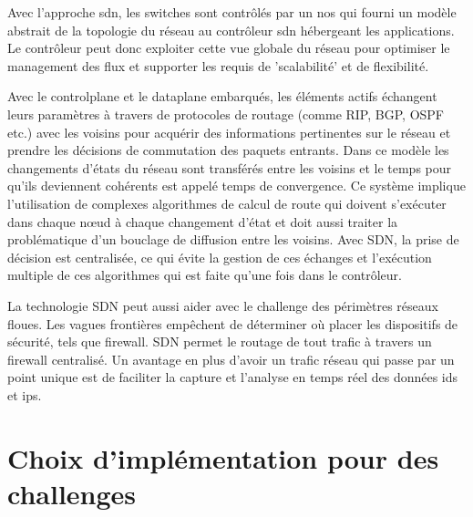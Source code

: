 Avec l'approche \gls{sdn}, les switches sont contrôlés par un \gls{nos} qui fourni un modèle abstrait de la topologie du réseau au contrôleur \gls{sdn} hébergeant les applications. Le contrôleur peut donc exploiter cette vue globale du réseau pour optimiser le management des flux et supporter les requis de 'scalabilité' et de flexibilité. \cite{WhySDN}

Avec le \gls{controlplane} et le \gls{dataplane} embarqués, les éléments actifs échangent leurs paramètres à travers de protocoles de routage (comme RIP, BGP, OSPF etc.) avec les voisins pour acquérir des informations pertinentes sur le réseau et prendre les décisions de commutation des paquets entrants. Dans ce modèle les changements d'états du réseau sont transférés entre les voisins et le temps pour qu'ils deviennent cohérents est appelé temps de convergence. Ce système implique l'utilisation de complexes algorithmes de calcul de route qui doivent s'exécuter dans chaque nœud à chaque changement d'état et doit aussi traiter la problématique d'un bouclage de diffusion entre les voisins. Avec SDN, la prise de décision est centralisée, ce qui évite la gestion de ces échanges et l'exécution multiple de ces algorithmes qui est faite qu'une fois dans le contrôleur. \cite{sdnbookControlDataPlanes}



La technologie SDN peut aussi aider avec le challenge des périmètres réseaux floues. Les vagues frontières empêchent de déterminer où placer les dispositifs de sécurité, tels que firewall. SDN permet le routage de tout trafic à travers un firewall centralisé. Un avantage en plus d'avoir un trafic réseau qui passe par un point unique est de faciliter la capture et l'analyse en temps réel des données \gls{ids} et \gls{ips}. \cite{sdnbookControlDataPlanes}

\section{Choix d'implémentation pour des challenges}


